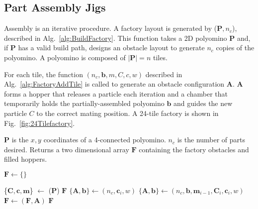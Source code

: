 \subsection{Part Assembly Jigs}\label{subsec:PartAssemblyJigs}

Assembly is an iterative procedure.  
A factory layout is generated by  {}($\mathbf{P}, n_c$), described in Alg.~\ref{alg:BuildFactory}. This function takes a 2D polyomino $\mathbf{P}$ and, if $\mathbf{P}$ has a valid build path, designs an obstacle layout to generate $n_c$ copies of the polyomino. A polyomino is composed of $|\mathbf{P}| = n$ tiles.  

For each tile, the function 
 {} $(n_c,\mathbf{b}, m,C, c,w)$
  described in  Alg.~\ref{alg:FactoryAddTile}
is called to generate an obstacle configuration $\mathbf{A}$.
$\mathbf{A}$  forms a hopper that releases a particle each iteration and a chamber that temporarily holds the partially-assembled polyomino $\mathbf{b}$ and guides the new particle $C$ to the correct mating position. A 24-tile factory is shown in  Fig.~\ref{fig:24Tilefactory}.


\begin{algorithm} 
\newcommand\algotext[1]{\end{algorithmic}#1\begin{algorithmic}[1]}
\caption{ ($\mathbf{P}, n_c$)\label{alg:BuildFactory}}
$\mathbf{P}$ is the $x,y$ coordinates of a 4-connected polyomino.  $n_c$ is the number of parts desired. 
Returns a two dimensional array $ \mathbf{F} $ containing the factory obstacles and filled hoppers.
\begin{algorithmic}[1]
\State$\mathbf{F} \leftarrow \{\}$  

\State \{$\mathbf{C},\mathbf{c}, \mathbf{m}$\} $  \leftarrow$ {}($\mathbf{P}$)
 \State \Return  $ \mathbf{F} $
 \EndIf 
 \State$\{ \mathbf{A}, \mathbf{b} \}\leftarrow${}$(n_c, \mathbf{c}_i,w)$
 \State$\{\mathbf{A},\mathbf{b}\}\leftarrow${}$(n_c,\mathbf{b}, \mathbf{m}_{i-1},\mathbf{C}_i, \mathbf{c}_i,w)$
 \State$ \mathbf{F} \leftarrow${}$(\mathbf{F},\mathbf{A})$
\EndFor
\State \Return  $ \mathbf{F} $
\end{algorithmic}
\end{algorithm} 
 
